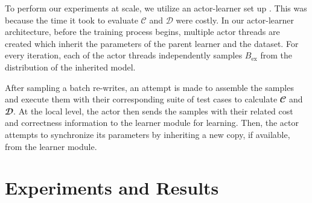 \documentclass{article}
\begin{document}
To perform our experiments at scale, we utilize an actor-learner set up  \citep{liang2018memory, espeholt2018impala}. This was because the time it took to evaluate $\mathcal{C}$ and $\mathcal{D}$ were costly. In our actor-learner architecture, before the training process begins, multiple actor threads are created which inherit the parameters of the parent learner and the dataset. For every iteration, each of the actor threads independently samples $B_{\textrm{ex}}$ from the distribution of the inherited model. 

After sampling a batch re-writes, an attempt is made to assemble the samples and execute them with their corresponding suite of test cases to calculate $\mathbfcal{C}$ and $\mathbfcal{D}$. At the local level, the actor then sends the samples with their related cost and correctness information to the learner module for learning. Then, the actor attempts to synchronize its parameters by inheriting a new copy, if available, from the learner module.



\section{Experiments and Results}
\label{sec:experiments}




\end{document}
